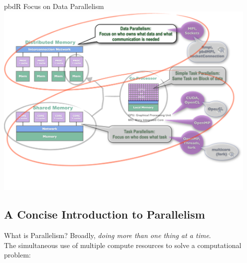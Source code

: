 \begin{frame}
\begin{block}{pbdR Focus on Data Parallelism}
    \includegraphics[width=0.95\textwidth]{pics/ParallelHardware11.pdf}
\end{block}
\end{frame}

\setcounter{framenumber}{0}

\subsection{A Concise Introduction to Parallelism}

\begin{frame}
  \begin{block}{What is Parallelism?}\pause
  Broadly, \emph{doing more than one thing at a time}.\\[.2cm]
  
  The simultaneous use of multiple compute resources to solve a computational problem: 
  \end{block}
\end{frame}

